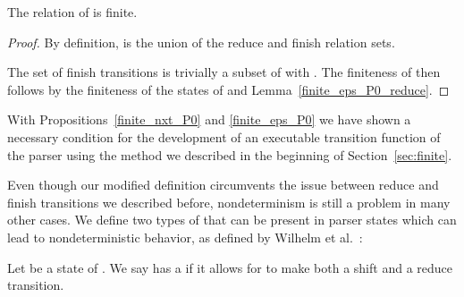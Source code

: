 \begin{isabellebody}
\begin{isamarkuptext}
\begin{proposition}\label{finite_eps_P0}
The  relation of  is finite.
\begin{proof}
By definition,  is the union of the reduce and finish relation sets. 

The set of finish transitions is trivially a subset of  
with . The finiteness of  then follows by
the finiteness of the states of  and Lemma~\ref{finite_eps_P0_reduce}.
\end{proof}
\end{proposition}

With Propositions~\ref{finite_nxt_P0} and \ref{finite_eps_P0} we have shown a necessary condition
for the development of an executable transition function of the  parser using the method we
described in the beginning of Section~\ref{sec:finite}.%
\end{isamarkuptext}\isamarkuptrue%
%
\isadelimdocument
%
\endisadelimdocument
%
\isatagdocument
%
\isamarkuptrue%
%
\endisatagdocument
{\isafolddocument}%
%
\isadelimdocument
%
\endisadelimdocument
%
\begin{isamarkuptext}%
Even though our modified  definition circumvents the issue between reduce and finish 
transitions we described before, nondeterminism is still a problem in many other cases. We 
define two types of  that can be present in parser states which can lead to 
nondeterministic behavior, as defined by Wilhelm et al.~\cite[p. 110]{Wilhelm}:

\begin{definition}
Let  be a state of . We say  has a  if it allows for 
 to make both a shift and a reduce transition.


\end{definition}
\end{isamarkuptext}
\end{isabellebody}
